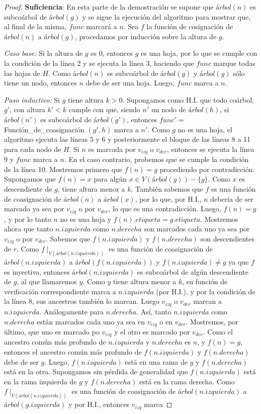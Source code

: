 \begin{proof}
     \textbf{Suficiencia}: En esta parte de la demostración se supone que $árbol(n)$ es subcoárbol de $árbol(g)$ y se sigue la ejecución del algoritmo para mostrar que, al final de la misma, $func$ marcará a $n$. Sea $f$ la función de cosignación de $árbol(n)$ a $árbol(g)$, procedamos por inducción sobre la altura de $g$.
    
    \emph{Caso base:} Si la altura de $g$ es 0, entonces $g$ es una hoja, por lo que se cumple con la condición de la línea 2 y se ejecuta la línea 3, haciendo que $func$ marque todas las hojas de $H$. Como $árbol(n)$ es subcoárbol de $árbol(g)$ y $árbol(g)$ sólo tiene un nodo, entonces $n$ debe de ser una hoja. Luego, $func$ marca a $n$.
    
    \emph{Paso inductivo:} Si $g$ tiene altura $k > 0$. Supongamos como H.I. que todo coárbol, $g'$, con altura $k' < k$ cumple con que, siendo $n'$ un nodo de $árbol(h)$, si $árbol(n')$ es subcoárbol de $árbol(g')$, entonces $func'=$Función\_de\_coasignación $(g',h)$ marca a $n'$. Como $g$ no es una hoja, el algoritmo ejecuta las líneas 5 y 6 y posteriormente el bloque de las líneas 8 a 11 para cada nodo de $H$. Si $n$ es marcada por $v_{izq}$ o $v_{der}$, entonces se ejecuta la línea 9 y $func$ marca a $n$. En el caso contrario, probemos que se cumple la condición de la línea 10. Mostremos primero que $f(n) = g$ procediendo por contradicción. Supongamos que $f(n) = x$ para algún $x\in V(árbol(g))-\{g\}$. Como $x$ es descendiente de $g$, tiene altura menor a $k$. También sabemos que $f$ es una función de coasignación de $árbol(n)$ a $árbol(x)$, por lo que, por H.I., $n$ debería de ser marcado ya sea por $v_{izq}$ o por $v_{der}$, lo que es una contradicción. Luego, $f(n) = g$, y por lo tanto $n$ no es una hoja y $f(n).etiqueta = g.etiqueta$. Mostremos ahora que tanto $n.izquierda$ como $n.derecha$ son marcados cada uno ya sea por $v_{izq}$ o por $v_{der}$. Sabemos que $f(n.izquierda)$ y $f(n.derecha)$ son descendientes de $r$. Como $f\mid_{V(árbol(n.izquierda))}$ es una función de coasignación de $árbol(n.izquierda)$ a $árbol(f(n.izquierda))$ y $f(n.izquierda) \neq g$ ya que $f$ es inyectiva, entonces $árbol(n.izquierda)$ es subcoárbol de algún descendiente de $g$, al que llamaremos $y$. Como $y$ tiene altura menor a $k$, su función de verificación correspondiente marca a $n.izquierda$ (por H.I.), y por la condición de la línea 8, sus ancestros también lo marcan. Luego $v_{izq}$ o $v_{der}$ marcan a $n.izquierda$. Análogamente para $n.derecha$. Así, tanto $n.izquierda$ como $n.derecha$ están marcados cada uno ya sea en $v_{izq}$ o en $v_{der}$. Mostremos, por último, que uno es marcado po $v_{izq}$ y el otro es marcado por $v_{der}$. Como el ancestro común más profundo de $n.izquierda$ y $n.derecha$ es $n$, y $f(n)=g$, entonces el ancestro común más profundo de $f(n.izquierda)$ y $f(n.derecha)$ debe de ser $g$. Luego, $f(n.izquierda)$ está en una rama de $g$ y $f(n.derecha)$ está en la otra. Supongamos sin pérdida de generalidad que $f(n.izquierda)$ está en la rama izquierda de $g$ y $f(n.derecha)$ está en la rama derecha. Como $f\mid_{V(árbol(n.izquierda))}$ es una función de coasignación de $árbol(n.izquierda)$ a $árbol(g.izquierda)$ y por H.I., entonces $v_{izq}$ marca 
\end{proof}
